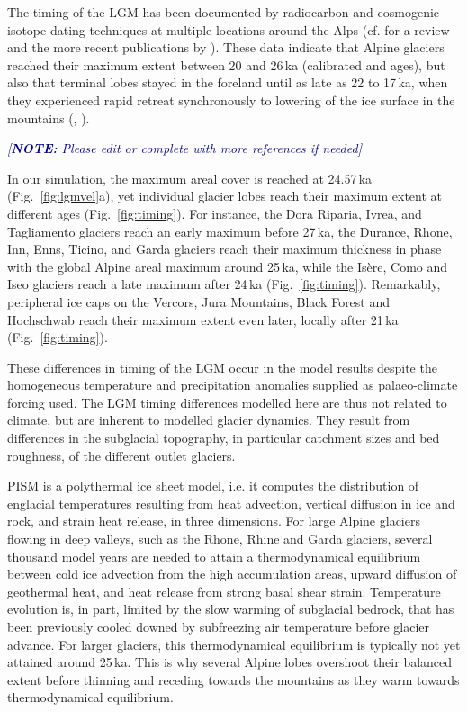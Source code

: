 \documentclass[tc, manuscript]{copernicus}
\newcommand{\note}[1]{\textcolor{darkblue}{\emph{[\textbf{NOTE:} #1]}}}
\begin{document}
    The timing of the LGM has been documented by radiocarbon and cosmogenic
    isotope dating techniques at multiple locations around the Alps (cf.
    \citealp[Fig.~5]{Wirsig.etal.2016} for a review and the more recent
    publications by \citealp{Monegato.etal.2017, Federici.etal.2017}). These
    data indicate that Alpine glaciers reached their maximum extent between 20
    and 26\,ka (calibrated  and  ages), but also
    that terminal lobes stayed in the foreland until as late as 22 to 17\,ka,
    when they experienced rapid retreat synchronously to lowering of the ice
    surface in the mountains (\citealp[Fig.~5]{Wirsig.etal.2016},
    \citealp[Fig.~3]{Monegato.etal.2017}).

    \note{Please edit or complete with more references if needed}

    In our simulation, the maximum areal cover is reached at 24.57\,ka
    (Fig.~\ref{fig:lgmvel}a), yet individual glacier lobes reach their
    maximum extent at different ages (Fig.~\ref{fig:timing}). For instance, the
    Dora Riparia, Ivrea, and Tagliamento glaciers reach an early maximum before
    27\,ka, the Durance, Rhone, Inn, Enns, Ticino, and Garda glaciers reach
    their maximum thickness in phase with the global Alpine areal maximum
    around 25\,ka, while the Isère, Como and Iseo glaciers reach a late maximum
    after 24\,ka (Fig.~\ref{fig:timing}). Remarkably, peripheral ice caps on
    the Vercors, Jura Mountains, Black Forest and Hochschwab reach their
    maximum extent even later, locally after 21\,ka (Fig.~\ref{fig:timing}).

    These differences in timing of the LGM occur in the model results despite
    the homogeneous temperature and precipitation anomalies supplied as
    palaeo-climate forcing used. The LGM timing differences modelled here are
    thus not related to climate, but are inherent to modelled glacier dynamics.
    They result from differences in the subglacial topography, in particular
    catchment sizes and bed roughness, of the different outlet glaciers.

    PISM is a polythermal ice sheet model, i.e. it computes the distribution
    of englacial temperatures resulting from heat advection, vertical
    diffusion in ice and rock, and strain heat release, in three dimensions.
    For large Alpine glaciers flowing in deep valleys, such as the Rhone,
    Rhine and Garda glaciers, several thousand model years are needed to attain
    a thermodynamical equilibrium between cold ice advection from the high
    accumulation areas, upward diffusion of geothermal heat, and heat release
    from strong basal shear strain. Temperature evolution is, in part, limited
    by the slow warming of subglacial bedrock, that has been previously cooled
    downed by subfreezing air temperature before glacier advance.
    For larger glaciers, this thermodynamical equilibrium is typically not yet
    attained around 25\,ka. This is why several Alpine lobes overshoot their
    balanced extent before thinning and receding towards the mountains as they
    warm towards thermodynamical equilibrium.
\end{document}

